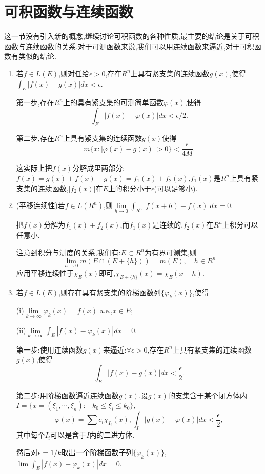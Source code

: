 \documentclass[12pt,a4paper,openany]{book}
\begin{document}
\section{可积函数与连续函数}
这一节没有引入新的概念,继续讨论可积函数的各种性质,最主要的结论是关于可积函数与连续函数的关系.对于可测函数来说,我们可以用连续函数来逼近,对于可积函数有类似的结论.

\begin{enumerate}
\item 若$f \in L(E)$,则对任给$\epsilon>0$,存在$R^n$上具有紧支集的连续函数$g(x)$,使得$\int_{E}{|f(x)-g(x)|dx}<\epsilon$.

第一步,存在$R^n$上的具有紧支集的可测简单函数$\varphi(x)$,使得
\[\int_{E}{|f(x)-\varphi(x)|dx} < \epsilon/2.\]

第二步,存在$R^n$上具有紧支集的连续函数$g(x)$使得
\[
m\{x : |\varphi(x) - g(x)|>0\} < \frac{\epsilon}{4M}.
\]

这实际上把$f(x)$分解成里两部分:$f(x) = g(x) + f(x)-g(x) = f_1(x) + f_2(x)$,$f_1(x)$是$R^n$上具有紧支集的连续函数,$|f_2(x)|$在$E$上的积分小于$\epsilon$(可以足够小).

\item (平移连续性)若$f \in L(R^n)$,则$\lim\limits_{h \rightarrow 0}{\int_{R^n}{|f(x+h) - f(x)|dx}} = 0$.

把$f(x)$分解为$f_1(x) + f_2(x)$,而$f_1(x)$是连续的,$f_2(x)$在$R^n$上积分可以任意小.

注意到积分与测度的关系,我们有:$E \subset R^n$为有界可测集,则
\[
\lim_{h \rightarrow 0}{m(E \cap (E + \{h\}))=m(E)}, \quad h \in R^n
\]
应用平移连续性于$\chi_{E}(x)$即可,$\chi_{E + \{h\}}(x) = \chi_{E}(x-h)$.

\item 若$f \in L(E)$,则存在具有紧支集的阶梯函数列$\{\varphi_k(x)\}$,使得

(i)$\lim\limits_{k \rightarrow \infty}{\varphi_k(x)} = f(x)$ a.e.,$x \in E$;

(ii)$\lim\limits_{k \rightarrow \infty}{\int_{E}{|f(x)-\varphi_k(x)|dx}} = 0$.

第一步:使用连续函数$g(x)$来逼近:$\forall \epsilon>0$,存在$R^n$上具有紧支集的连续函数$g(x)$,使得
\[
\int_{E}{|f(x)-g(x)|dx} < \frac{\epsilon}{2}.
\]

第二步:用阶梯函数逼近连续函数$g(x)$.设$g(x)$的支集含于某个闭方体内$I=\{x=(\xi_1, \cdots,\xi_n):-k_0 \le \xi_i \le k_0\}$,
\[
\varphi(x) = \sum{c_i\chi_{I_i}(x)},\int_{I}{|g(x) - \varphi(x)|dx} < \frac{\epsilon}{2},
\]
其中每个$I_i$可以是含于$I$内的二进方体.

然后对$\epsilon = 1/k$取出一个阶梯函数子列$\{\varphi_k(x)\}$,$\lim{\int_{E}{|f(x) - \varphi_k(x)|dx}} = 0$.


\end{enumerate}
\end{document}
